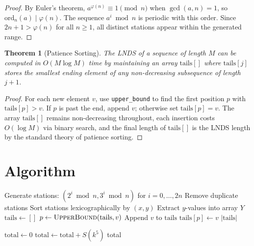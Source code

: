 \documentclass[11pt]{article}
\newtheorem{theorem}{Theorem}
\begin{document}
\begin{proof}
By Euler's theorem, $a^{\varphi(n)} \equiv 1 \pmod{n}$ when $\gcd(a,n)=1$, so $\mathrm{ord}_n(a) \mid \varphi(n)$. The sequence $a^i \bmod n$ is periodic with this order. Since $2n + 1 > \varphi(n)$ for all $n \ge 1$, all distinct stations appear within the generated range.
\end{proof}

\begin{theorem}[Patience Sorting]
The LNDS of a sequence of length $M$ can be computed in $O(M \log M)$ time by maintaining an array $\mathrm{tails}[]$ where $\mathrm{tails}[j]$ stores the smallest ending element of any non-decreasing subsequence of length $j+1$.
\end{theorem}

\begin{proof}
For each new element $v$, use \texttt{upper\_bound} to find the first position $p$ with $\mathrm{tails}[p] > v$. If $p$ is past the end, append $v$; otherwise set $\mathrm{tails}[p] = v$. The array $\mathrm{tails}[]$ remains non-decreasing throughout, each insertion costs $O(\log M)$ via binary search, and the final length of $\mathrm{tails}[]$ is the LNDS length by the standard theory of patience sorting.
\end{proof}

\section{Algorithm}

\begin{algorithm}[H]
\caption{Compute $S(n)$}
\begin{algorithmic}[1]
\State Generate stations: $(2^i \bmod n, 3^i \bmod n)$ for $i = 0,\dots,2n$
\State Remove duplicate stations
\State Sort stations lexicographically by $(x, y)$
\State Extract $y$-values into array $Y$
\State $\mathrm{tails} \gets []$
    \State $p \gets \textsc{UpperBound}(\mathrm{tails}, v)$
        \State Append $v$ to $\mathrm{tails}$
    \Else
        \State $\mathrm{tails}[p] \gets v$
    \EndIf
\EndFor
\State \Return $|\mathrm{tails}|$
\end{algorithmic}
\end{algorithm}

\begin{algorithm}[H]
\caption{Main: Compute $\sum_{k=1}^{30} S(k^5)$}
\begin{algorithmic}[1]
\State $\text{total} \gets 0$
    \State $\text{total} \gets \text{total} + S(k^5)$
\EndFor
\State \Return total
\end{algorithmic}
\end{algorithm}
\end{document}
